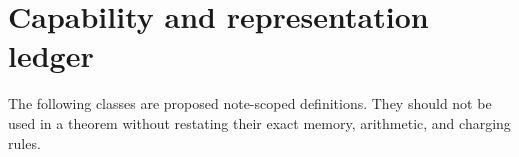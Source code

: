 \section{Capability and representation ledger}
\label{sec:hierarchy}

The following classes are proposed note-scoped definitions.  They should not
be used in a theorem without restating their exact memory, arithmetic, and
charging rules.
